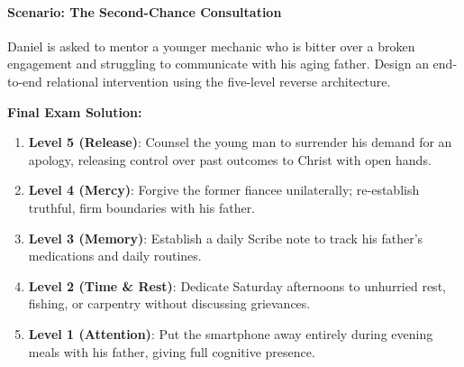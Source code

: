 \documentclass[11pt]{report}
\begin{document}
\paragraph{Scenario: The Second-Chance Consultation}
Daniel is asked to mentor a younger mechanic who is bitter over a broken engagement and struggling to communicate with his aging father. Design an end-to-end relational intervention using the five-level reverse architecture.

\begin{blackboard}
\textbf{Final Exam Solution:}
\begin{enumerate}
    \item \textbf{Level 5 (Release)}: Counsel the young man to surrender his demand for an apology, releasing control over past outcomes to Christ with open hands.
    \item \textbf{Level 4 (Mercy)}: Forgive the former fiancee unilaterally; re-establish truthful, firm boundaries with his father.
    \item \textbf{Level 3 (Memory)}: Establish a daily Scribe note to track his father's medications and daily routines.
    \item \textbf{Level 2 (Time \& Rest)}: Dedicate Saturday afternoons to unhurried rest, fishing, or carpentry without discussing grievances.
    \item \textbf{Level 1 (Attention)}: Put the smartphone away entirely during evening meals with his father, giving full cognitive presence.
\end{enumerate}
\end{blackboard}
\end{document}
